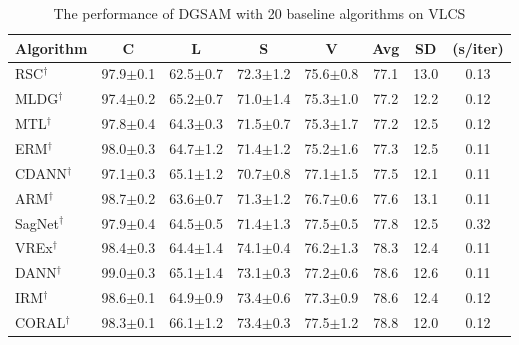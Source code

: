 \documentclass{article}
\theoremstyle{plain}
\theoremstyle{definition}
\theoremstyle{remark}
\begin{document}
\begin{table}[!ht]
\centering
\normalsize
\caption{The performance of DGSAM with 20 baseline algorithms on VLCS}
\begin{tabular}{l|cccc|ccc}
\hline
Algorithm        &  C   & L   & S   & V   & Avg   & SD   & (s/iter) \\ \toprule
RSC\(^\dag\) \cite{huang2020rsc}         & {97.9\scriptsize$\pm$0.1} & {62.5\scriptsize$\pm$0.7} & {72.3\scriptsize$\pm$1.2} & {75.6\scriptsize$\pm$0.8} & 77.1 & 13.0 & 0.13 \\
MLDG\(^\dag\) \cite{li2018mldg}         & {97.4\scriptsize$\pm$0.2} & {65.2\scriptsize$\pm$0.7} & {71.0\scriptsize$\pm$1.4} & {75.3\scriptsize$\pm$1.0} & 77.2 & 12.2 & 0.12 \\
MTL\(^\dag\) \cite{blanchard2021mtl}         & {97.8\scriptsize$\pm$0.4} & {64.3\scriptsize$\pm$0.3} & {71.5\scriptsize$\pm$0.7} & {75.3\scriptsize$\pm$1.7} & 77.2 & 12.5 & 0.12 \\
ERM\(^\dag\)         & {98.0\scriptsize$\pm$0.3} & {64.7\scriptsize$\pm$1.2} & {71.4\scriptsize$\pm$1.2} & {75.2\scriptsize$\pm$1.6} & 77.3 & 12.5 & 0.11 \\
CDANN\(^\dag\) \cite{li2018cdann}         & {97.1\scriptsize$\pm$0.3} & {65.1\scriptsize$\pm$1.2} & {70.7\scriptsize$\pm$0.8} & {77.1\scriptsize$\pm$1.5} & 77.5 & 12.1 & 0.11 \\
ARM\(^\dag\) \cite{zhang2021arm}         & {98.7\scriptsize$\pm$0.2} & {63.6\scriptsize$\pm$0.7} & {71.3\scriptsize$\pm$1.2} & {76.7\scriptsize$\pm$0.6} & 77.6 & 13.1 & 0.11 \\
SagNet\(^\dag\) \cite{nam2021sagnet}         & {97.9\scriptsize$\pm$0.4} & {64.5\scriptsize$\pm$0.5} & {71.4\scriptsize$\pm$1.3} & {77.5\scriptsize$\pm$0.5} & 77.8 & 12.5 & 0.32 \\
VREx\(^\dag\) \cite{krueger2021vrex}         & {98.4\scriptsize$\pm$0.3} & {64.4\scriptsize$\pm$1.4} & {74.1\scriptsize$\pm$0.4} & {76.2\scriptsize$\pm$1.3} & 78.3 & 12.4 & 0.11 \\
DANN\(^\dag\) \cite{ganin2016dann}         & {99.0\scriptsize$\pm$0.3} & {65.1\scriptsize$\pm$1.4} & {73.1\scriptsize$\pm$0.3} & {77.2\scriptsize$\pm$0.6} & 78.6 & 12.6 & 0.11 \\
IRM\(^\dag\) \cite{arjovsky2019irm}         & {98.6\scriptsize$\pm$0.1} & {64.9\scriptsize$\pm$0.9} & {73.4\scriptsize$\pm$0.6} & {77.3\scriptsize$\pm$0.9} & 78.6 & 12.4 & 0.12 \\
CORAL\(^\dag\) \cite{sun2016coral}         & {98.3\scriptsize$\pm$0.1} & {66.1\scriptsize$\pm$1.2} & {73.4\scriptsize$\pm$0.3} & {77.5\scriptsize$\pm$1.2} & 78.8 & 12.0 & 0.12 \\

\end{tabular}
\end{table}
\end{document}
